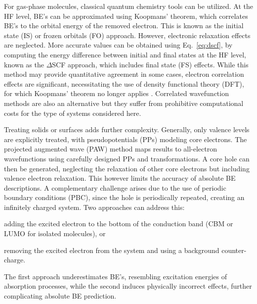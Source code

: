 \documentclass[journal=jpccck,manuscript=article]{achemso}
\begin{document}
For gas-phase molecules, classical quantum chemistry tools can be utilized. At the HF level, BE's can be approximated using Koopmans' theorem, which correlates BE's to the orbital energy of the removed electron. This is known as the initial state (IS) or frozen orbitals (FO) approach.\cite{pueyobellafontPredictionCoreLevel2015} However, electronic relaxation effects are neglected. More accurate values can be obtained using Eq.~\eqref{eq:dscf}, by computing the energy difference between initial and final states at the HF level, known as the $\Delta$SCF approach, which includes final state (FS) effects. While this method may provide quantitative agreement in some cases, electron correlation effects are significant, necessitating the use of density functional theory (DFT), for which Koopmans' theorem no longer applies \cite{pueyobellafontPredictionCoreLevel2015,pueyobellafontPredictingCoreLevel2017,kleinNutsBoltsCorehole2021}. Correlated wavefunction methods are also an alternative but they suffer from prohibitive computational costs for the type of systems considered here.

Treating solids or surfaces adds further complexity.\cite{garcia-gilCalculationCoreLevel2012,bagusXrayPhotoelectronSpectroscopy2024} Generally, only valence levels are explicitly treated, with pseudopotentials (PPs) modeling core electrons. The projected augmented wave (PAW) method maps results to all-electron wavefunctions using carefully designed PPs and transformations\cite{blochlProjectorAugmentedwaveMethod1994}. A core hole can then be generated, neglecting the relaxation of other core electrons but including valence electron relaxation\cite{garcia-gilCalculationCoreLevel2012}. This however limits the accuracy of absolute BE descriptions.
A complementary challenge arises due to the use of periodic boundary conditions (PBC), since the hole is periodically repeated, creating an infinitely charged system. Two approaches can address this: 
\begin{inparaenum}[(i)]
	\item adding the excited electron to the bottom of the conduction band (CBM or LUMO for isolated molecules), or 
	\item removing the excited electron from the system and using a background counter-charge.
\end{inparaenum}
The first approach underestimates BE's, resembling excitation energies of absorption processes, while the second induces physically incorrect effects, further complicating absolute BE prediction.\cite{olovssonCorelevelShiftsComplex2006,garcia-gilCalculationCoreLevel2012,pueyobellafontPerformanceTPSSFunctional2016,pueyobellafontPredictingCoreLevel2017,taucherFinalStateSimulationsCoreLevel2020}
\end{document}

